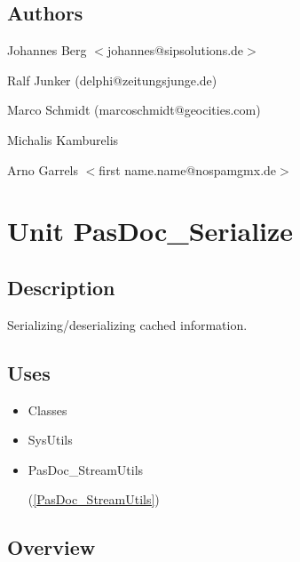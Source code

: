 \documentclass{report}
\begin{document}
\section{Authors}
\par
Johannes Berg {$<$}johannes@sipsolutions.de{$>$}

\par
Ralf Junker (delphi@zeitungsjunge.de)

\par
Marco Schmidt (marcoschmidt@geocities.com)

\par
Michalis Kamburelis

\par
Arno Garrels {$<$}first name.name@nospamgmx.de{$>$}

\chapter{Unit PasDoc{\_}Serialize}
\label{PasDoc_Serialize}
\section{Description}
Serializing/deserializing cached information.\hfill\vspace*{1ex}

 
\section{Uses}
\begin{itemize}
\item \begin{ttfamily}Classes\end{ttfamily}\item \begin{ttfamily}SysUtils\end{ttfamily}\item \begin{ttfamily}PasDoc{\_}StreamUtils\end{ttfamily}(\ref{PasDoc_StreamUtils})\end{itemize}
\section{Overview}
\begin{description}
\item[\texttt{\begin{ttfamily}EInvalidCacheFileVersion\end{ttfamily} Class}]
\item[\texttt{\begin{ttfamily}TSerializable\end{ttfamily} Class}]
\item[\texttt{\begin{ttfamily}ESerializedException\end{ttfamily} Class}]
\end{description}
\end{document}
